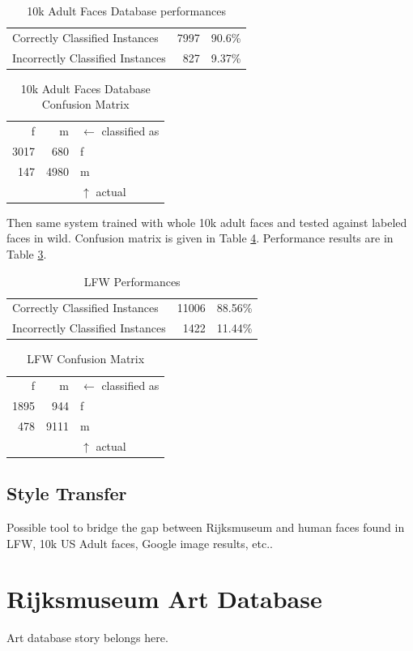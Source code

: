 \documentclass[runningheads]{llncs}
\newcommand*{\confMat}[6]{
		\begin{tabular}{rrl}
			#1 & #2 & $\leftarrow$ classified as\\
			#3 & #4 & #1\\
			#5&#6&#2\\
			& & $\uparrow$ actual
		\end{tabular}
		}
\newcommand{\fillertext}{\textcolor{black!20}{\lipsum[5-6]}}
\begin{document}
\begin{table}
	\centering
	\caption{10k Adult Faces Database performances}\label{tab:10kadultPerformance}
	\hspace{1cm}
	\begin{tabular}{l|rr}
		Correctly Classified Instances & 7997 & 90.6\%\\
		Incorrectly Classified Instances & 827 & 9.37\%\\
	\end{tabular}
\end{table}

\begin{table}
	\centering
	\caption{10k Adult Faces Database Confusion Matrix}\label{tab:10kadultConfusion}
	\hspace{1cm}
	\confMat{f}{m}{3017}{680}{147}{4980}
\end{table}

Then same system trained with whole 10k adult faces and tested against labeled faces in wild. Confusion matrix is given in Table \ref{tab:10kadultTrainLFWTestConfusion}. Performance results are in Table \ref{tab:10kadultTrainLFWTestPerformance}.

\begin{table}
	\centering
	\caption{LFW Performances}\label{tab:10kadultTrainLFWTestPerformance}
	\hspace{1cm}
	\begin{tabular}{l|rr}
		Correctly Classified Instances & 11006 & 88.56\%\\
		Incorrectly Classified Instances & 1422 & 11.44\%\\
	\end{tabular}
\end{table}

\begin{table}
	\centering
	\caption{LFW Confusion Matrix}\label{tab:10kadultTrainLFWTestConfusion}
	\hspace{1cm}
	\confMat{f}{m}{1895}{944}{478}{9111}
\end{table}
\fillertext
\subsection{Style Transfer}
Possible tool to bridge the gap between Rijksmuseum and human faces found in LFW, 10k US Adult faces, Google image results, etc..
\fillertext
\section{Rijksmuseum Art Database}
Art database story belongs here.
\end{document}
